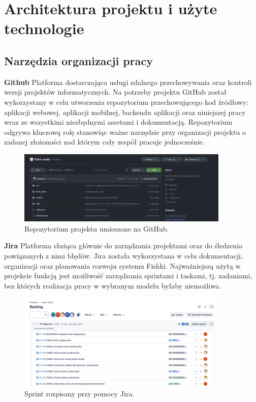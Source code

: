 \chapter{Architektura projektu i użyte technologie}

\section{Narzędzia organizacji pracy}

\textbf{Github} Platforma dostarczająca usługi zdalnego przechowywania oraz kontroli wersji projektów informatycznych. Na potrzeby projektu GitHub został wykorzystany w celu utworzenia repozytorium przechowującego kod źródłowy: aplikacji webowej, aplikacji mobilnej, backendu aplikacji oraz niniejszej pracy wraz ze wszystkimi niezbędnymi assetami i dokumentacją. Repozytorium odgrywa kluczową rolę stanowiąc ważne narzędzie przy organizacji projektu o zadanej złożoności nad którym cały zespół pracuje jednocześnie.

\begin{figure}[H]
    \centering
    \includegraphics[width=0.9\textwidth]{chapters/chapter_7/github.png}
    \caption{Repozytorium projektu umieszone na GitHub.}
    \label{img:github}
\end{figure}


\textbf{Jira} Platforma służąca głównie do zarządzania projektami oraz do śledzenia powiązanych z nimi błędów. Jira została wykorzystana w celu dokumentacji, organizacji oraz planowania rozwoju systemu Fishki. Najważniejszą użytą w projekcie funkcją jest możliwość zarządzania sprintami i taskami, tj. zadaniami, bez których realizacja pracy w wybranym modelu byłaby niemożliwa.

\begin{figure}[H]
    \centering
    \includegraphics[width=0.9\textwidth]{chapters/chapter_7/jira.png}
    \caption{Sprint rozpisany przy pomocy Jira.}
    \label{img:jira}
\end{figure}


